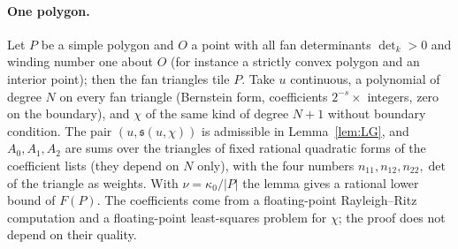 \documentclass[11pt]{article}
\theoremstyle{remark}
\newcommand{\s}{\mathfrak{s}}
\begin{document}
\paragraph{One polygon.} Let $P$ be a simple polygon and $O$ a point with all fan determinants $\det_k>0$ and winding
number one about $O$ (for instance a strictly convex polygon and an interior point); then the fan triangles tile $P$. Take $u$ continuous,
a polynomial of degree $N$ on every fan triangle (Bernstein form, coefficients $2^{-s}\times$ integers, zero on the
boundary), and $\chi$ of the same kind of degree $N+1$ without boundary condition. The pair $(u,\s(u,\chi))$ is
admissible in Lemma~\ref{lem:LG}, and $A_0,A_1,A_2$ are sums over the triangles of fixed rational quadratic forms of the
coefficient lists (they depend on $N$ only), with the four numbers $n_{11},n_{12},n_{22},\det$ of the triangle as
weights. With $\nu=\kappa_0/|P|$ the lemma gives a rational lower bound of $F(P)$. The coefficients come from a
floating-point Rayleigh--Ritz computation and a floating-point least-squares problem for $\chi$; the proof does not
depend on their quality.
\end{document}
